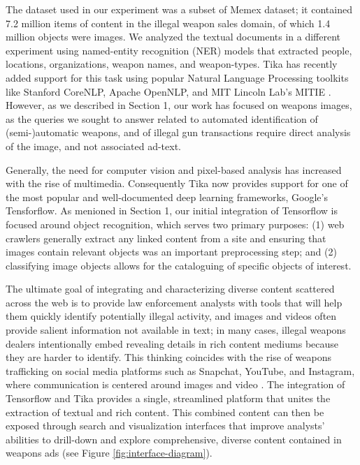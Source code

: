 The dataset used in our experiment was a subset of Memex dataset; it contained 7.2 million items of content in the illegal weapon sales domain, of which 1.4 million objects were images. We analyzed the textual documents in a different experiment using named-entity recognition (NER) models that extracted people, locations, organizations, weapon names, and weapon-types. Tika has recently added support for this task using popular Natural Language Processing toolkits like Stanford CoreNLP\cite{Finkel:2005:INI:1219840.1219885}, Apache OpenNLP\cite{ApacheOpenNLP}, and MIT Lincoln Lab's MITIE \cite{MITIE-github}. However, as we described in Section 1, our work has focused on weapons images, as the queries we sought to answer related to automated identification of (semi-)automatic weapons, and of illegal gun transactions require direct analysis of the image, and not associated ad-text.

Generally,  the need for computer vision and pixel-based analysis has increased with the rise of multimedia. Consequently Tika now provides support for one of the most popular and well-documented deep learning frameworks, Google's Tensforflow. As menioned in Section 1, our initial integration of Tensorflow is focused around object recognition, which serves two primary purposes: (1) web crawlers generally extract any linked content from a site and ensuring that images contain relevant objects was an important preprocessing step; and (2) classifying image objects allows for the cataloguing of specific objects of interest. 

The ultimate goal of integrating and characterizing diverse content scattered across the web is to provide law enforcement analysts with tools that will help them quickly identify potentially illegal activity, and images and videos often provide salient information not available in text; in many cases, illegal weapons dealers intentionally embed revealing details in rich content mediums because they are harder to identify. This thinking coincides with the rise of weapons trafficking on social media platforms such as Snapchat, YouTube, and Instagram, where communication is centered around images and video \cite{socialmedia}. The integration of Tensorflow and Tika provides a single, streamlined platform that unites the extraction of textual and rich content. This combined content can then be exposed through search and visualization interfaces that improve analysts' abilities to drill-down and explore comprehensive, diverse content contained in weapons ads (see Figure \ref{fig:interface-diagram}). 
